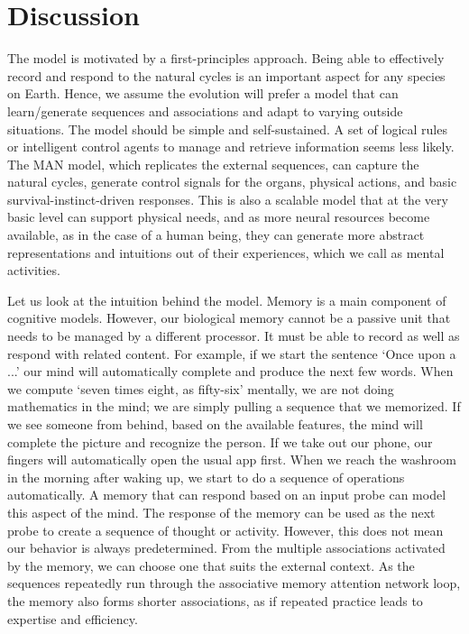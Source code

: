 \documentclass[reprint,amsmath,amssymb,apr,aip,onecolumn, 11pt]{revtex4-1}
\begin{document}
	\section{Discussion}
	
The model is motivated by a first-principles approach. Being able to effectively record and respond to the natural cycles is an important aspect for any species on Earth. Hence, we assume the evolution will prefer a model that can learn/generate sequences and associations and adapt to varying outside situations. The model should be simple and self-sustained. A set of logical rules or intelligent control agents to manage and retrieve information seems less likely. The MAN model, which replicates the external sequences, can capture the natural cycles, generate control signals for the organs, physical actions, and basic survival-instinct-driven responses. This is also a scalable model that at the very basic level can support physical needs, and as more neural resources become available, as in the case of a human being, they can generate more abstract representations and intuitions out of their experiences, which we call as mental activities. 







Let us look at the intuition behind the model. Memory is a main component of cognitive models. However, our biological memory cannot be a passive unit that needs to be managed by a different processor. It must be able to record as well as respond with related content. For example, if we start the sentence `Once upon a ...' our mind will automatically complete and produce the next few words. When we compute `seven times eight, as fifty-six' mentally, we are not doing mathematics in the mind; we are simply pulling a sequence that we memorized.  If we see someone from behind, based on the available features, the mind will complete the picture and recognize the person. If we take out our phone, our fingers will automatically open the usual app first. When we reach the washroom in the morning after waking up, we start to do a sequence of operations automatically. A memory that can respond based on an input probe can model this aspect of the mind.  The response of the memory can be used as the next probe to create a sequence of thought or activity. However, this does not mean our behavior is always predetermined. From the multiple associations activated by the memory, we can choose one that suits the external context. As the sequences repeatedly run through the associative memory attention network loop, the memory also forms shorter associations, as if repeated practice leads to expertise and efficiency.
\end{document}
